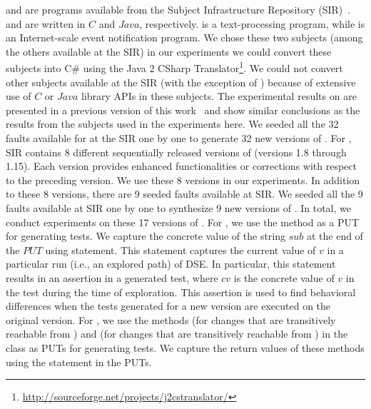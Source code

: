  and  are programs available from the Subject Infrastructure Repository (SIR)~\cite{doESE05}.  and  are written in $C$ and $Java$, respectively.  is a text-processing program, while  is an Internet-scale event notification program. We chose these two subjects (among the others available at the SIR) in our experiments we could convert these subjects into C\# using the Java 2 CSharp Translator\footnote{\url{http://sourceforge.net/projects/j2cstranslator/}}. We could not convert other subjects available at the SIR (with the exception of ) because of extensive use of $C$ or $Java$ library APIs in these subjects. The experimental results on  are presented in a previous version of this work~\cite{taneja09:guided} and show similar conclusions as the results from the subjects used in the experiments here. We seeded all the 32 faults available for  at the SIR one by one to generate 32 new versions of . For , SIR contains 8 different sequentially released versions of  (versions 1.8 through 1.15). Each version provides enhanced functionalities or corrections with respect to the preceding version. We use these 8 versions in our experiments. In addition to these 8 versions, there are 9 seeded faults available at SIR. We seeded all the 9 faults available at SIR one by one to synthesize 9 new versions of . 
In total, we conduct experiments on these 17 versions of . For , we use the  method as a PUT for generating tests. We capture the concrete value of the string $sub$ at the end of the $PUT$ using  statement. This statement captures the current value of $v$ in a particular run
(i.e., an explored path) of DSE. In particular, this statement
results in an assertion  in a generated test, where $cv$ is the concrete value of $v$ in the test during the time of exploration. 
This assertion is used to find behavioral differences when the tests generated for a new version are executed on the original version. For , we use the methods  (for changes that are transitively reachable from ) and  (for changes that are transitively reachable from ) in the class  as PUTs for generating tests. We capture the return values of these methods using the  statement 
in the PUTs.

